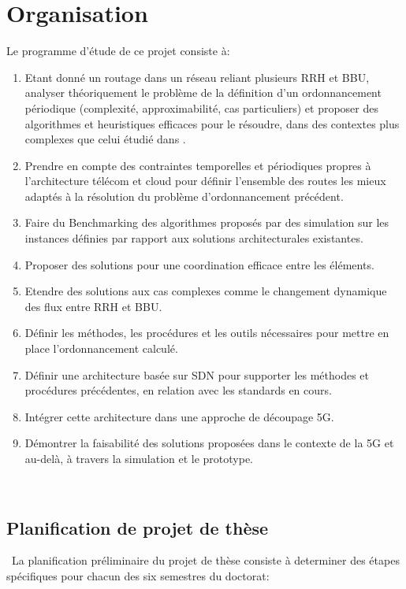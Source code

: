 \documentclass{article}
\begin{document}
\section*{Organisation}
Le programme d'étude de ce projet consiste à:
  \begin{enumerate}
  \item Etant donné un routage dans un réseau reliant plusieurs RRH et BBU, analyser théoriquement le problème de la définition d'un ordonnancement périodique (complexité, approximabilité, cas particuliers) et proposer des algorithmes et heuristiques efficaces pour le résoudre, dans des contextes plus complexes que celui étudié dans \cite{rapportstage}.
  \item Prendre en compte des contraintes temporelles et périodiques propres à l'architecture télécom et cloud pour définir l'ensemble des routes les mieux adaptés à la résolution du problème d'ordonnancement précédent.
\item Faire du Benchmarking des algorithmes proposés par des simulation sur les instances définies par rapport aux solutions architecturales existantes.
\item Proposer des solutions pour une coordination efficace entre les éléments.
\item Etendre des solutions aux cas complexes comme le changement dynamique des flux entre RRH et BBU.
\item Définir les méthodes, les procédures et les outils nécessaires pour mettre en place l'ordonnancement calculé.
\item Définir une architecture basée sur SDN pour supporter les méthodes et procédures précédentes, en relation avec les standards en cours.
\item Intégrer cette architecture dans une approche de découpage 5G.
\item Démontrer la faisabilité des solutions proposées dans le contexte de la 5G et au-delà, à travers la simulation et le prototype.
 \end {enumerate}
 \subsection * {Planification de projet de thèse}
 La planification préliminaire du projet de thèse consiste à determiner des étapes spécifiques pour chacun des six semestres du doctorat:
\end{document}

